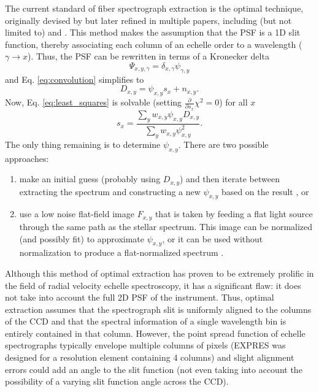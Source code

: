 \documentclass[11pt]{article}
\begin{document}
The current standard of fiber spectrograph extraction is the optimal technique, originally devised by \citet{Horne1986} but later refined in multiple papers, including (but not limited to) \citet{Piskunov2002} and \citet{Zechmeister2013}. This method makes the assumption that the PSF is a 1D slit function, thereby associating each column of an echelle order to a wavelength ($\gamma \rightarrow x$). Thus, the PSF can be rewritten in terms of a Kronecker delta
\begin{equation}
    \Psi_{x,y,\gamma} = \delta_{x,\gamma}\psi_{\gamma,y}
\label{eq:psf_optimal}
\end{equation}
and Eq. \ref{eq:convolution} simplifies to
\begin{equation}
    D_{x,y} = \psi_{x,y} s_x + n_{x,y}.
\end{equation}
Now, Eq. \ref{eq:least_squares} is solvable (setting $\frac{\partial}{\partial s_x} \chi^2 = 0$) for all $x$
\begin{equation}
    s_x = \frac{\sum_y w_{x,y} \psi_{x,y} D_{x,y}}{\sum_y w_{x,y} \psi^2_{x,y}}.
\end{equation}
The only thing remaining is to determine $\psi_{x,y}$. There are two possible approaches:
\begin{enumerate}
    \item make an initial guess (probably using $D_{x,y}$) and then iterate between extracting the spectrum and constructing a new $\psi_{x,y}$ based on the result \citep{Horne1986, Piskunov2002}, or
    \item use a low noise flat-field image $F_{x,y}$ that is taken by feeding a flat light source through the same path as the stellar spectrum. This image can be normalized (and possibly fit) to approximate $\psi_{x,y}$, or it can be used without normalization to produce a flat-normalized spectrum \citep{Zechmeister2013}.
\end{enumerate}

Although this method of optimal extraction has proven to be extremely prolific in the field of radial velocity echelle spectroscopy, it has a significant flaw: it does not take into account the full 2D PSF of the instrument. Thus, optimal extraction assumes that the spectrograph slit is uniformly aligned to the columns of the CCD and that the spectral information of a single wavelength bin is entirely contained in that column. However, the point spread function of echelle spectrographs typically envelope multiple columns of pixels (EXPRES was designed for a resolution element containing 4 columns) and slight alignment errors could add an angle to the slit function (not even taking into account the possibility of a varying slit function angle across the CCD).
\end{document}
